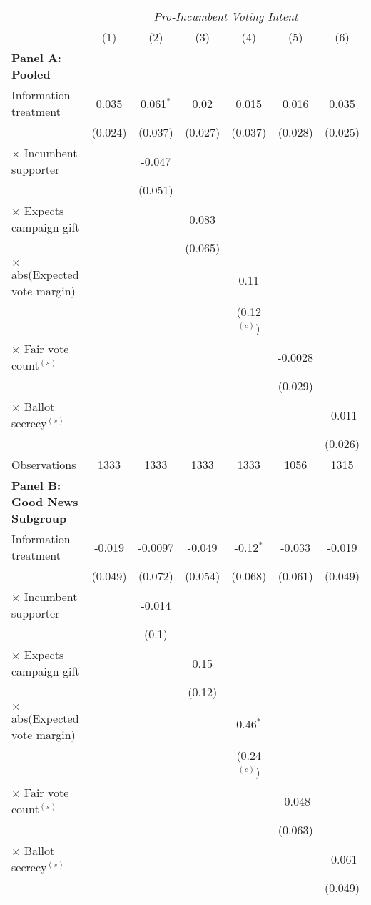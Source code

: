 
    \begin{center}
    \begin{tabular}{l c c c c c c }
    \hline
    &\multicolumn{6}{c}{\emph{Pro-Incumbent Voting Intent}}\\
    &(1)&(2)&(3)&(4)&(5)&(6)\\
    \hline
    \textbf{Panel A: Pooled}\\
    \hline
    Information treatment &0.035&0.061$^{*}$&0.02&0.015&0.016&0.035\\
    &(0.024)&(0.037)&(0.027)&(0.037)&(0.028)&(0.025)\\
    $\times$ Incumbent supporter & &-0.047& & & & \\
    & &(0.051)& & & & \\
    $\times$ Expects campaign gift & & &0.083 & & & \\
    & & &(0.065) & & & \\
    $\times$ abs(Expected vote margin) & & & &0.11& & \\
    & & & &(0.12$^{(c)}$)& & \\
    $\times$ Fair vote count$^{(s)}$ & & & & &-0.0028& \\
    & & & & &(0.029)& \\
    $\times$ Ballot secrecy$^{(s)}$ & & & & & &-0.011\\
    & & & & & &(0.026)\\
    Observations &1333&1333&1333&1333&1056&1315\\
    \hline
    \textbf{Panel B: Good News Subgroup}\\
    \hline
    Information treatment &-0.019&-0.0097&-0.049&-0.12$^{*}$&-0.033&-0.019\\
    &(0.049)&(0.072)&(0.054)&(0.068)&(0.061)&(0.049)\\
    $\times$ Incumbent supporter & &-0.014& & & & \\
    & &(0.1)& & & & \\
    $\times$ Expects campaign gift & & &0.15 & & & \\
    & & &(0.12) & & & \\
    $\times$ abs(Expected vote margin) & & & &0.46$^{*}$& & \\
    & & & &(0.24$^{(c)}$)& & \\
    $\times$ Fair vote count$^{(s)}$ & & & & &-0.048& \\
    & & & & &(0.063)& \\
    $\times$ Ballot secrecy$^{(s)}$ & & & & & &-0.061\\
    & & & & & &(0.049)\\

\end{tabular}
\end{center}
